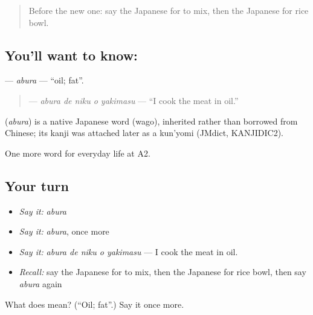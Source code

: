 \label{lesson:JA-C175-abura}



\begin{quote}
Before the new one: say the Japanese for to mix, then the Japanese for rice bowl.
\end{quote}

\subsection*{You'll want to know: }
\textbf{} — \emph{abura} — \textquotedblleft{}oil; fat\textquotedblright{}.

\begin{quote}
\textbf{  } — \emph{abura de niku o yakimasu} — \textquotedblleft{}I cook the meat in oil.\textquotedblright{}
\end{quote}

\begin{cousinweb}
\textbf{} (\emph{abura}) is a native Japanese word (wago), inherited rather than borrowed from Chinese; its kanji was attached later as a kun'yomi (JMdict, KANJIDIC2).
\end{cousinweb}

\begin{grammarlens}[title={What you've built}]
One more word for everyday life at A2.
\end{grammarlens}

\subsection*{Your turn}
\begin{itemize}
\raggedright
  \item \emph{Say it:} \emph{abura}
  \item \emph{Say it:} \emph{abura}, once more
  \item \emph{Say it:} \emph{abura de niku o yakimasu} — I cook the meat in oil.
  \item \emph{Recall:} say the Japanese for to mix, then the Japanese for rice bowl, then say \emph{abura} again
\end{itemize}

\begin{tcolorbox}[breakable,colback=teal!4,colframe=teal!35!black,title={Before you move on}]
What does  mean? (\textquotedblleft{}Oil; fat\textquotedblright{}.) Say it once more.
\end{tcolorbox}
